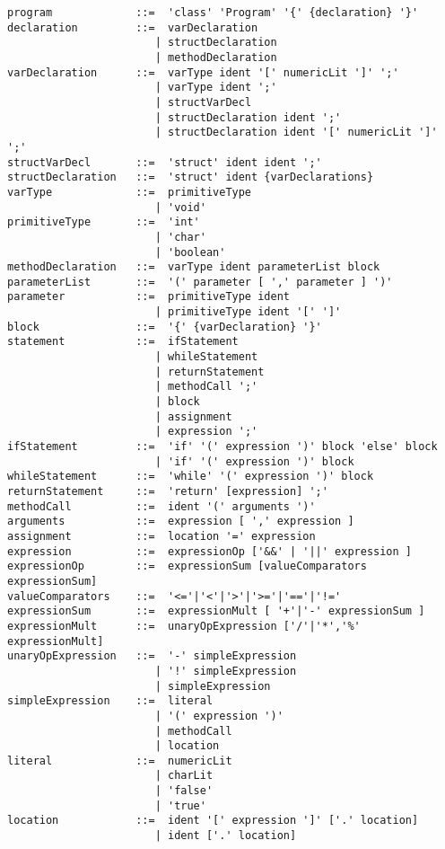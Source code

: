 \documentclass[12pt,letterpaper]{article}
\begin{document}
\begin{lstlisting}
program             ::=  'class' 'Program' '{' {declaration} '}'
declaration         ::=  varDeclaration
                       | structDeclaration 
                       | methodDeclaration
varDeclaration      ::=  varType ident '[' numericLit ']' ';'
                       | varType ident ';'
                       | structVarDecl
                       | structDeclaration ident ';'
                       | structDeclaration ident '[' numericLit ']' ';'
structVarDecl       ::=  'struct' ident ident ';'
structDeclaration   ::=  'struct' ident {varDeclarations}
varType             ::=  primitiveType 
                       | 'void'
primitiveType       ::=  'int' 
                       | 'char'
                       | 'boolean'
methodDeclaration   ::=  varType ident parameterList block
parameterList       ::=  '(' parameter [ ',' parameter ] ')'
parameter           ::=  primitiveType ident
                       | primitiveType ident '[' ']'
block               ::=  '{' {varDeclaration} '}'
statement           ::=  ifStatement 
                       | whileStatement
                       | returnStatement
                       | methodCall ';'
                       | block
                       | assignment
                       | expression ';'
ifStatement         ::=  'if' '(' expression ')' block 'else' block
                       | 'if' '(' expression ')' block                       
whileStatement      ::=  'while' '(' expression ')' block
returnStatement     ::=  'return' [expression] ';'
methodCall          ::=  ident '(' arguments ')'
arguments           ::=  expression [ ',' expression ]
assignment          ::=  location '=' expression
expression          ::=  expressionOp ['&&' | '||' expression ]
expressionOp        ::=  expressionSum [valueComparators expressionSum]
valueComparators    ::=  '<='|'<'|'>'|'>='|'=='|'!='
expressionSum       ::=  expressionMult [ '+'|'-' expressionSum ]
expressionMult      ::=  unaryOpExpression ['/'|'*','%' expressionMult]
unaryOpExpression   ::=  '-' simpleExpression 
                       | '!' simpleExpression
                       | simpleExpression
simpleExpression    ::=  literal
                       | '(' expression ')'
                       | methodCall
                       | location
literal             ::=  numericLit 
                       | charLit 
                       | 'false' 
                       | 'true'
location            ::=  ident '[' expression ']' ['.' location]
                       | ident ['.' location] 
\end{lstlisting}
\end{document}
